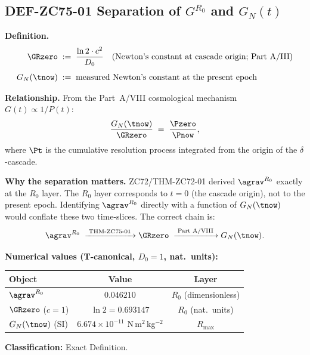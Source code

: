 \documentclass[12pt, a4paper]{article}
\begin{document}
\subsection{DEF-ZC75-01 \quad Separation of $G^{R_0}$ and $G_N(t)$}
\label{sec:def01}


\begin{formalbox}[title={DEF-ZC75-01: $G^{R_0}$ vs $G_N(t)$
  --- Two Distinct Objects ($R_0$, Exact)}]

\textbf{Definition.}
\begin{align}
  \GRzero &\;:=\; \frac{\ln 2 \cdot c^2}{D_0}
    \quad\text{(Newton's constant at cascade origin; Part~A/III)}
    \label{eq:GRzero}\\[4pt]
  G_N(\tnow) &\;:=\; \text{measured Newton's constant at the present epoch}
    \label{eq:GNow}
\end{align}

\textbf{Relationship.}
From the Part~A/VIII cosmological mechanism $G(t) \propto 1/P(t)$:
\[
  \frac{G_N(\tnow)}{\GRzero}
  \;=\; \frac{\Pzero}{\Pnow},
\]
where $\Pt$ is the cumulative resolution process integrated from
the origin of the $\delta$-cascade.

\textbf{Why the separation matters.}
ZC72/THM-ZC72-01 derived $\agrav^{R_0}$ exactly at the $R_0$ layer.
The $R_0$ layer corresponds to $t = 0$ (the cascade origin), not to
the present epoch. Identifying $\agrav^{R_0}$ directly with a
function of $G_N(\tnow)$ would conflate these two time-slices.
The correct chain is:
\[
  \agrav^{R_0}
  \;\xrightarrow{\;\text{THM-ZC75-01}\;}
  \GRzero
  \;\xrightarrow{\;\text{Part~A/VIII}\;}
  G_N(\tnow).
\]

\textbf{Numerical values (T-canonical, $D_0 = 1$, nat.\ units):}
\begin{center}
{\small
\begin{tabular}{lcc}
\toprule
Object & Value & Layer \\
\midrule
$\agrav^{R_0}$ & $0.046210$ & $R_0$ (dimensionless) \\
$\GRzero$ ($c=1$) & $\ln 2 = 0.693147$ & $R_0$ (nat.\ units) \\
$G_N(\tnow)$ (SI) & $6.674 \times 10^{-11}$ N\,m$^2$\,kg$^{-2}$ & $R_{\max}$ \\
\bottomrule
\end{tabular}}
\end{center}

\textbf{Classification:} Exact Definition.
\end{formalbox}
\end{document}
